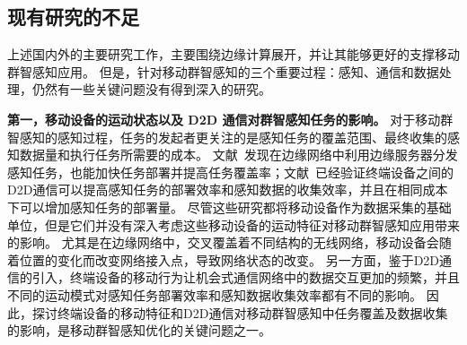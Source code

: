 

\subsection{现有研究的不足}


上述国内外的主要研究工作，主要围绕边缘计算展开，并让其能够更好的支撑移动群智感知应用。
但是，针对移动群智感知的三个重要过程：感知、通信和数据处理，仍然有一些关键问题没有得到深入的研究。


\textbf{第一，移动设备的运动状态以及 D2D 通信对群智感知任务的影响。}
对于移动群智感知的感知过程，任务的发起者更关注的是感知任务的覆盖范围、最终收集的感知数据量和执行任务所需要的成本。
文献~发现在边缘网络中利用边缘服务器分发感知任务，也能加快任务部署并提高任务覆盖率；文献~已经验证终端设备之间的D2D通信可以提高感知任务的部署效率和感知数据的收集效率，并且在相同成本下可以增加感知任务的部署量。
尽管这些研究都将移动设备作为数据采集的基础单位，但是它们并没有深入考虑这些移动设备的运动特征对移动群智感知应用带来的影响。
尤其是在边缘网络中，交叉覆盖着不同结构的无线网络，移动设备会随着位置的变化而改变网络接入点，导致网络状态的改变。
另一方面，鉴于D2D通信的引入，终端设备的移动行为让机会式通信网络中的数据交互更加的频繁，并且不同的运动模式对感知任务部署效率和感知数据收集效率都有不同的影响。
因此，探讨终端设备的移动特征和D2D通信对移动群智感知中任务覆盖及数据收集的影响，是移动群智感知优化的关键问题之一。


